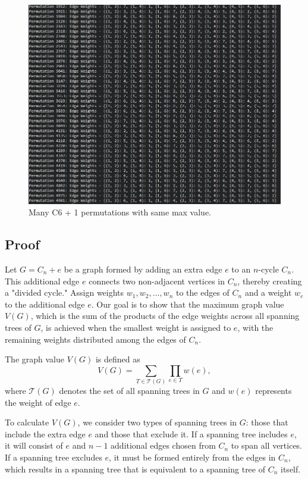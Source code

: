 \documentclass[12pt,letterpaper]{article}
\begin{document}
\begin{figure}[hbt!]  
    \begin{center}
    \includegraphics[width=5in]{f3.11.jpg}
    \caption{\label{Marble2} Many C6 + 1 permutations with same max value.}
    \end{center}
	\end{figure}
\newpage
\subsection{Proof}

Let \( G = C_n + e \) be a graph formed by adding an extra edge \( e \) to an \( n \)-cycle \( C_n \). This additional edge \( e \) connects two non-adjacent vertices in \( C_n \), thereby creating a "divided cycle." Assign weights \( w_1, w_2, \ldots, w_n \) to the edges of \( C_n \) and a weight \( w_{e} \) to the additional edge \( e \). Our goal is to show that the maximum graph value \( V(G) \), which is the sum of the products of the edge weights across all spanning trees of \( G \), is achieved when the smallest weight is assigned to \( e \), with the remaining weights distributed among the edges of \( C_n \).

The graph value \( V(G) \) is defined as
\[
V(G) = \sum_{T \in \mathcal{T}(G)} \prod_{e \in T} w(e),
\]
where \( \mathcal{T}(G) \) denotes the set of all spanning trees in \( G \) and \( w(e) \) represents the weight of edge \( e \).

To calculate \( V(G) \), we consider two types of spanning trees in \( G \): those that include the extra edge \( e \) and those that exclude it. If a spanning tree includes \( e \), it will consist of \( e \) and \( n - 1 \) additional edges chosen from \( C_n \) to span all vertices. If a spanning tree excludes \( e \), it must be formed entirely from the edges in \( C_n \), which results in a spanning tree that is equivalent to a spanning tree of \( C_n \) itself.
\end{document}
